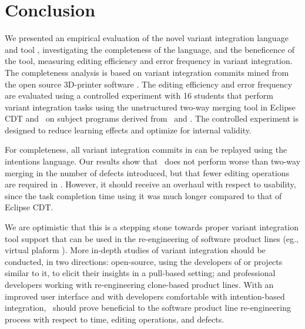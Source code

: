 \chapter{Conclusion}

We presented an empirical evaluation of the novel variant integration language and tool \tooln, investigating the completeness of the language, and the beneficence of the tool, measuring editing efficiency and error frequency in variant integration. The completeness analysis is based on variant integration commits mined from the open source 3D-printer software \marlin.
The editing efficiency and error frequency are evaluated using a controlled experiment with 16 students that perform variant integration tasks using the unstructured two-way merging tool in Eclipse CDT and \tooln~on subject programs derived from \busybox~and \vim. The controlled experiment is designed to reduce learning effects and optimize for internal validity.

For completeness, all variant integration commits in \marlin can be replayed using the intentions language. Our results show that \tooln~does not perform worse than two-way merging in the number of defects introduced, but that fewer editing operations are required in \tooln. However, it should receive an overhaul with respect to usability, since the task completion time using it was much longer compared to that of Eclipse CDT.

We are optimistic that this is a stepping stone towards proper variant integration tool support that can be used in the re-engineering of software product lines (eg., virtual plaform \cite{antkiewicz2014flexible}). More in-depth studies of variant integration should be conducted, in two directions: open-source, using the developers of \marlin or projects similar to it, to elicit their insights in a pull-based setting; and professional developers working with re-engineering clone-based product lines.
With an improved user interface and with developers comfortable with intention-based integration, \tooln~should prove beneficial to the software product line re-engineering process with respect to time, editing operations, and defects.

